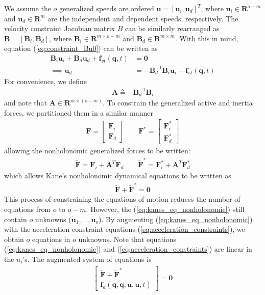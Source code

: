 \documentclass[smallcondensed,final]{svjour3}                     %
\begin{document}
We assume the $o$ generalized speeds are ordered $\mathbf{u} = [\mathbf{u}_i,
\mathbf{u}_d]^T$, where $\mathbf{u}_i\in\mathbf{R}^{o-m}$ and
$\mathbf{u}_d\in\mathbf{R}^{m}$ are the independent and dependent speeds,
respectively. The velocity constraint Jacobian matrix $B$ can be similarly
rearranged as $\mathbf{B} = [\mathbf{B}_i, \mathbf{B}_d]$, where
$\mathbf{B}_i\in \mathbf{R}^{m \times o-m}$ and $\mathbf{B}_d \in \mathbf{R}^{m
\times m}$. With this in mind, equation (\ref{eq:constraint_Bu0}) can be
written as
\begin{align}
\mathbf{B}_i \mathbf{u}_i + \mathbf{B}_d \mathbf{u}_d + \mathbf{f}_{vt}(\mathbf{q}, t) &= \mathbf{0} \\
\implies \mathbf{u}_d &= -\mathbf{B}_d^{-1} \mathbf{B}_i \mathbf{u}_i - \mathbf{f}_{vt}(\mathbf{q}, t)
\end{align}
For convenience, we define
\begin{align}
\label{eq:constraint_A}
\mathbf{A} \triangleq - \mathbf{B}_{d}^{-1} \mathbf{B}_i
\end{align}
and note that $\mathbf{A}\in\mathbf{R}^{m \times (o - m)}$. To constrain the
generalized active and inertia forces, we partitioned them in a similar
manner
\begin{align}
\label{eq:F_Fstar_rewrite}
\mathbf{F} = \begin{bmatrix} \mathbf{F}_i \\ \mathbf{F}_d \end{bmatrix} \quad
\quad \mathbf{F}^* = \begin{bmatrix} \mathbf{F}^*_i \\ \mathbf{F}^*_d
\end{bmatrix}
\end{align}
allowing the nonholonomic generalized forces to be written:
\begin{align}
\label{eq:F_Fstar_nonholonomic}
\tilde{\mathbf{F}} = \mathbf{F}_i + \mathbf{A}^T \mathbf{F}_d \quad \quad
\tilde{\mathbf{F}}^* = \mathbf{F}_i^* + \mathbf{A}^T \mathbf{F}_d^*
\end{align}
which allows Kane's nonholonomic dynamical equations to be written as
\begin{align}
\label{eq:kanes_eq_nonholonomic}
\tilde{\mathbf{F}} + \tilde{\mathbf{F}}^* = \mathbf{0}
\end{align}
This process of constraining the equations of motion reduces the number of
equations from $o$ to $o-m$. However, the (\ref{eq:kanes_eq_nonholonomic}) still
contain $o$ unknowns ($\dot{\mathbf{u}}_1,...,\dot{\mathbf{u}}_o$). By
augmenting (\ref{eq:kanes_eq_nonholonomic}) with the acceleration constraint
equations (\ref{eq:acceleration_constraints}), we obtain $o$ equations in
$o$ unknowns. Note that equations (\ref{eq:kanes_eq_nonholonomic}) and
(\ref{eq:acceleration_constraints}) are linear in the $\dot{u}_i$'s. The
augmented system of equations is
\begin{align}
\label{eq:F_Fstar_f_a}
\begin{bmatrix}
\tilde{\mathbf{F}} + \tilde{\mathbf{F}}^* \\
\mathbf{f}_a (\mathbf{q}, \dot{\mathbf{q}}, \mathbf{u}, \dot{\mathbf{u}}, t)
\end{bmatrix} = \mathbf{0}
\end{align}
\end{document}
